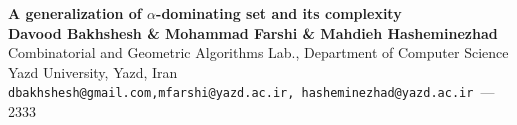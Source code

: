 \documentclass[a0,portrait]{a0poster}
\theoremstyle{definition}
\theoremstyle{plain}
\theoremstyle{definition}
\begin{document}
 \BgThispage
\begin{center}
\veryHuge \color{NavyBlue} \textbf{A generalization of $\alpha$-dominating set and its complexity} \color{Black}\\ %
\huge \textbf{Davood Bakhshesh \& Mohammad Farshi \& Mahdieh Hasheminezhad}\\[0.5cm] %
\huge Combinatorial and Geometric Algorithms Lab., Department of Computer Science\\ Yazd University, Yazd, Iran\\[0.4cm] %
\Large \texttt{{dbakhshesh@gmail.com},{mfarshi@yazd.ac.ir}, {hasheminezhad@yazd.ac.ir}
}--- 2333\\ %
\end{center}
\vspace{1cm} %

\end{document}
